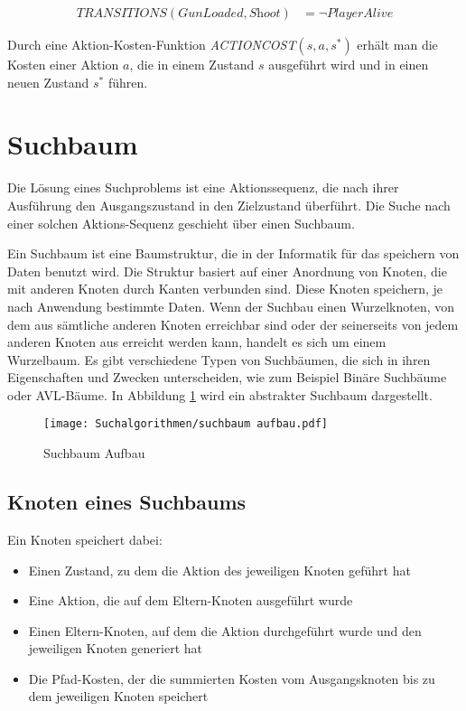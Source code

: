 \begin{align}
	\textit{TRANSITIONS}(\textit{GunLoaded}, \textit{Shoot}) &= \lnot \textit{PlayerAlive}
\end{align}

Durch eine Aktion-Kosten-Funktion \textit{ACTIONCOST}$(s,a,s^*)$ erh\"{a}lt man die Kosten einer Aktion $a$, die in einem Zustand $s$ ausgef\"{u}hrt wird und in einen neuen Zustand $s^*$ f\"{u}hren.

\section{Suchbaum}
\label{chap:suchbaum}

Die L\"{o}sung eines Suchproblems ist eine Aktionssequenz, die nach ihrer Ausf\"{u}hrung den Ausgangszustand in den Zielzustand \"{u}berf\"{u}hrt. Die Suche nach einer solchen Aktions-Sequenz geschieht \"{u}ber einen Suchbaum.

Ein Suchbaum ist eine Baumstruktur, die in der Informatik f\"{u}r das speichern von Daten benutzt wird. Die Struktur basiert auf einer Anordnung von Knoten, die mit anderen Knoten durch Kanten verbunden sind. Diese Knoten speichern, je nach Anwendung bestimmte Daten. Wenn der Suchbau einen Wurzelknoten, von dem aus s\"{a}mtliche anderen Knoten erreichbar sind oder der seinerseits von jedem anderen Knoten aus erreicht werden kann, handelt es sich um einem Wurzelbaum. Es gibt verschiedene Typen von Suchb\"{a}umen, die sich in ihren Eigenschaften und Zwecken unterscheiden, wie zum Beispiel Bin\"{a}re Suchb\"{a}ume oder AVL-B\"{a}ume. In Abbildung \ref{fig:suchabaum aufbau} wird ein abstrakter Suchbaum dargestellt.

\begin{figure}[h]
  \centering
  \texttt{[image: Suchalgorithmen/suchbaum aufbau.pdf]}
	\captionsetup{justification=justified, format=plain}
  \caption{Suchbaum Aufbau}
  \label{fig:suchabaum aufbau}
\end{figure}

\subsection{Knoten eines Suchbaums}
\label{chap:knoten eines suchbaums}

Ein Knoten speichert dabei:
\begin{itemize}
	\item Einen Zustand, zu dem die Aktion des jeweiligen Knoten gef\"{u}hrt hat
	\item Eine Aktion, die auf dem Eltern-Knoten ausgef\"{u}hrt wurde
	\item Einen Eltern-Knoten, auf dem die Aktion durchgef\"{u}hrt wurde und den jeweiligen Knoten generiert hat
	\item Die Pfad-Kosten, der die summierten Kosten vom Ausgangsknoten bis zu dem jeweiligen Knoten speichert
\end{itemize}

